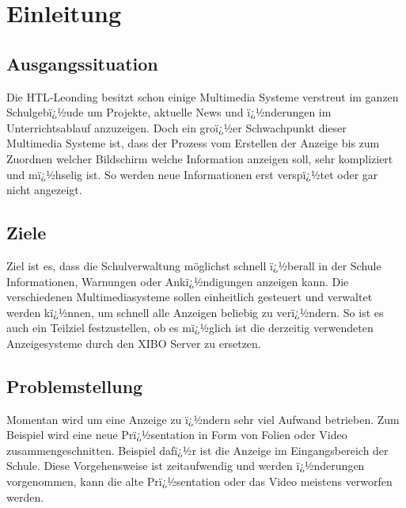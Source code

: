 \chapter{Einleitung}
\section{Ausgangssituation}
Die HTL-Leonding besitzt schon einige Multimedia Systeme verstreut im ganzen Schulgebï¿½ude um Projekte, aktuelle News und ï¿½nderungen im Unterrichtsablauf anzuzeigen. Doch ein groï¿½er Schwachpunkt dieser Multimedia Systeme ist, dass der Prozess vom Erstellen der Anzeige bis zum Zuordnen welcher Bildschirm welche Information anzeigen soll, sehr kompliziert und mï¿½hselig ist. So werden neue Informationen erst verspï¿½tet oder gar nicht angezeigt. 

\section{Ziele}
Ziel ist es, dass die Schulverwaltung möglichst schnell ï¿½berall in der Schule Informationen, Warnungen oder Ankï¿½ndigungen anzeigen kann. Die verschiedenen Multimediasysteme sollen einheitlich gesteuert und verwaltet werden kï¿½nnen, um schnell alle Anzeigen beliebig zu verï¿½ndern. So ist es auch ein Teilziel festzustellen, ob es mï¿½glich ist die derzeitig verwendeten Anzeigesysteme durch den XIBO Server zu ersetzen.

\section{Problemstellung}
Momentan wird um eine Anzeige zu ï¿½ndern sehr viel Aufwand betrieben. Zum Beispiel wird eine neue Prï¿½sentation in Form von Folien oder Video zusammengeschnitten. Beispiel dafï¿½r ist die Anzeige im Eingangsbereich der Schule. Diese Vorgehensweise ist zeitaufwendig und werden ï¿½nderungen vorgenommen, kann  die alte Prï¿½sentation oder das Video meistens verworfen werden.

